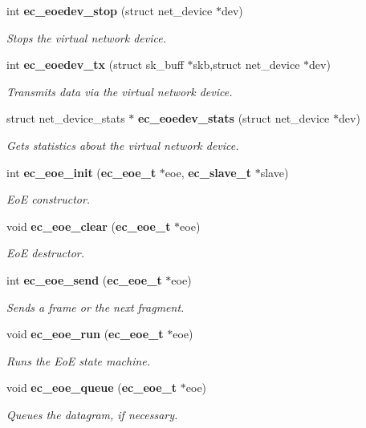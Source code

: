 \begin{DoxyCompactItemize}
int {\bf ec\-\_\-eoedev\-\_\-stop} (struct net\-\_\-device $\ast$dev)
\begin{DoxyCompactList}\small\item\em Stops the virtual network device. \end{DoxyCompactList}\item 
int {\bf ec\-\_\-eoedev\-\_\-tx} (struct sk\-\_\-buff $\ast$skb,struct net\-\_\-device $\ast$dev)
\begin{DoxyCompactList}\small\item\em Transmits data via the virtual network device. \end{DoxyCompactList}\item 
struct net\-\_\-device\-\_\-stats $\ast$ {\bf ec\-\_\-eoedev\-\_\-stats} (struct net\-\_\-device $\ast$dev)
\begin{DoxyCompactList}\small\item\em Gets statistics about the virtual network device. \end{DoxyCompactList}\item 
int {\bf ec\-\_\-eoe\-\_\-init} ({\bf ec\-\_\-eoe\-\_\-t} $\ast$eoe, {\bf ec\-\_\-slave\-\_\-t} $\ast$slave)
\begin{DoxyCompactList}\small\item\em Eo\-E constructor. \end{DoxyCompactList}\item 
void {\bf ec\-\_\-eoe\-\_\-clear} ({\bf ec\-\_\-eoe\-\_\-t} $\ast$eoe)
\begin{DoxyCompactList}\small\item\em Eo\-E destructor. \end{DoxyCompactList}\item 
int {\bf ec\-\_\-eoe\-\_\-send} ({\bf ec\-\_\-eoe\-\_\-t} $\ast$eoe)
\begin{DoxyCompactList}\small\item\em Sends a frame or the next fragment. \end{DoxyCompactList}\item 
void {\bf ec\-\_\-eoe\-\_\-run} ({\bf ec\-\_\-eoe\-\_\-t} $\ast$eoe)
\begin{DoxyCompactList}\small\item\em Runs the Eo\-E state machine. \end{DoxyCompactList}\item 
void {\bf ec\-\_\-eoe\-\_\-queue} ({\bf ec\-\_\-eoe\-\_\-t} $\ast$eoe)
\begin{DoxyCompactList}\small\item\em Queues the datagram, if necessary. \end{DoxyCompactList}\item 

\end{DoxyCompactItemize}
